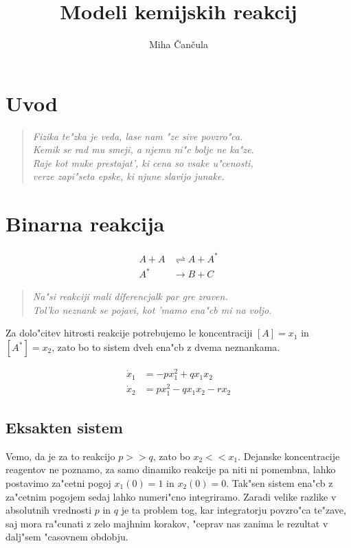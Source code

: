 \documentclass[a4paper,10pt]{article}
\title{Modeli kemijskih reakcij}
\author{Miha \v Can\v cula}
\begin{document}
\maketitle

\section{Uvod}

\begin{verse}
\textit{Fizika te"zka je veda, lase nam "ze sive povzro"ca. \\ 
Kemik se rad mu smeji, a njemu ni"c bolje ne ka"ze. \\
Raje kot muke prestajat', ki cena so vsake u"cenosti, \\
verze zapi"seta epske, ki njune slavijo junake.}
\end{verse}

 \section{Binarna reakcija}

\begin{align}
 A + A &\rightleftharpoons A + A^* \\
 A^* &\rightarrow B + C
\end{align}

\begin{verse}
\textit{Na"si reakciji mali d\'iferencjalk par gre zraven.}  \\
\textit{Tol'ko neznank se pojavi, kot 'mamo ena"cb mi na voljo.} \\
\end{verse}

\begin{comment}
Reakciji ustreza sistem linearnih ena"cb prvega reda.
\end{comment}

Za dolo"citev hitrosti reakcije potrebujemo le koncentraciji $[A] = x_1$ in $[A^*] = x_2$, zato bo to sistem dveh ena"cb z dvema neznankama. 

\begin{align}
  \dot x_1 &= -p x_1^2 + q x_1 x_2 \label{eq:n1-sistem-1} \\
  \dot x_2 &= p x_1^2 - q x_1 x_2 - r x_2
\end{align}

\subsection{Eksakten sistem}
Vemo, da je za to reakcijo $p >> q$, zato bo $x_2 << x_1$. Dejanske koncentracije reagentov ne poznamo, za samo dinamiko reakcije pa niti ni pomembna, lahko postavimo za"cetni pogoj $x_1(0) = 1$ in $x_2(0) = 0$. Tak"sen sistem ena"cb z za"cetnim pogojem sedaj lahko numeri"cno integriramo. Zaradi velike razlike v absolutnih vrednosti $p$ in $q$ je ta problem tog, kar integratorju povzro"ca te"zave, saj mora ra"cunati z zelo majhnim korakov, "ceprav nas zanima le rezultat v dalj"sem "casovnem obdobju. 
\end{document}
